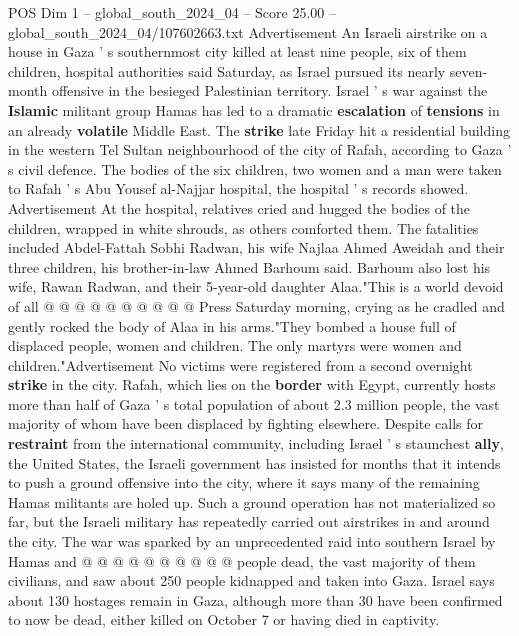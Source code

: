 \begin{textsample}{POS Dim 1 – global\_south\_2024\_04 – Score 25.00 – global\_south\_2024\_04/107602663.txt}  \label{ex:f1_pos_050}
Advertisement An Israeli airstrike on a house in Gaza ' s southernmost city killed at least nine people, six of them children, hospital authorities said Saturday, as Israel pursued its nearly seven-month offensive in the besieged Palestinian territory.
Israel ' s war against the \textbf{Islamic} militant group Hamas has led to a dramatic \textbf{escalation} of \textbf{tensions} in an already \textbf{volatile} Middle East.
The \textbf{strike} late Friday hit a residential building in the western Tel Sultan neighbourhood of the city of Rafah, according to Gaza ' s civil defence.
The bodies of the six children, two women and a man were taken to Rafah ' s Abu Yousef al-Najjar hospital, the hospital ' s records showed.
Advertisement At the hospital, relatives cried and hugged the bodies of the children, wrapped in white shrouds, as others comforted them.
The fatalities included Abdel-Fattah Sobhi Radwan, his wife Najlaa Ahmed Aweidah and their three children, his brother-in-law Ahmed Barhoum said.
Barhoum also lost his wife, Rawan Radwan, and their 5-year-old daughter Alaa."This is a world devoid of all @ @ @ @ @ @ @ @ @ @ Press Saturday morning, crying as he cradled and gently rocked the body of Alaa in his arms."They bombed a house full of displaced people, women and children.
The only martyrs were women and children."Advertisement No victims were registered from a second overnight \textbf{strike} in the city.
Rafah, which lies on the \textbf{border} with Egypt, currently hosts more than half of Gaza ' s total population of about 2.3 million people, the vast majority of whom have been displaced by fighting elsewhere.
Despite calls for \textbf{restraint} from the international community, including Israel ' s staunchest \textbf{ally}, the United States, the Israeli government has insisted for months that it intends to push a ground offensive into the city, where it says many of the remaining Hamas militants are holed up.
Such a ground operation has not materialized so far, but the Israeli military has repeatedly carried out airstrikes in and around the city.
The war was sparked by an unprecedented raid into southern Israel by Hamas and @ @ @ @ @ @ @ @ @ @ people dead, the vast majority of them civilians, and saw about 250 people kidnapped and taken into Gaza.
Israel says about 130 hostages remain in Gaza, although more than 30 have been confirmed to now be dead, either killed on October 7 or having died in captivity.

\end{textsample}
